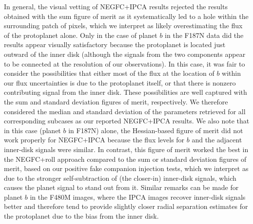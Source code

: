 \documentclass[longauth]{aa}
\begin{document}
\begin{appendix}
In general, the visual vetting of NEGFC+IPCA results rejected the results obtained with the sum figure of merit as it systematically led to a hole within the surrounding patch of pixels, which we interpret as likely overestimating the flux of the protoplanet alone. Only in the case of planet $b$ in the F187N data did the results appear visually satisfactory because the protoplanet is located just outward of the inner disk (although the signals from the two components appear to be connected at the resolution of our observations). In this case, it was fair to consider the possibilities that either most of the flux at the location of $b$ within our flux uncertainties is due to the protoplanet itself, or that there is nonzero contributing signal from the inner disk. These possibilities are well captured with the sum and standard deviation figures of merit, respectively. We therefore considered the median and standard deviation of the parameters retrieved for all corresponding subcases %
as our reported NEGFC+IPCA results. We also note that in this case (planet $b$ in F187N) alone, the Hessian-based figure of merit did not work properly for NEGFC+IPCA because the flux levels for $b$ and the adjacent inner-disk signals were similar.
In contrast, this figure of merit worked the best in the NEGFC+roll approach compared to the sum or standard deviation figures of merit, based on our positive fake companion injection tests, which we interpret as due to the stronger self-subtraction of (the closer-in) inner-disk signals, which causes the planet signal to stand out from it. %
Similar remarks can be made for planet $b$ in the F480M images, where the IPCA images recover inner-disk signals better and therefore tend to provide slightly closer radial separation estimates for the protoplanet due to the bias from the inner disk. %


\end{appendix}
\end{document}

